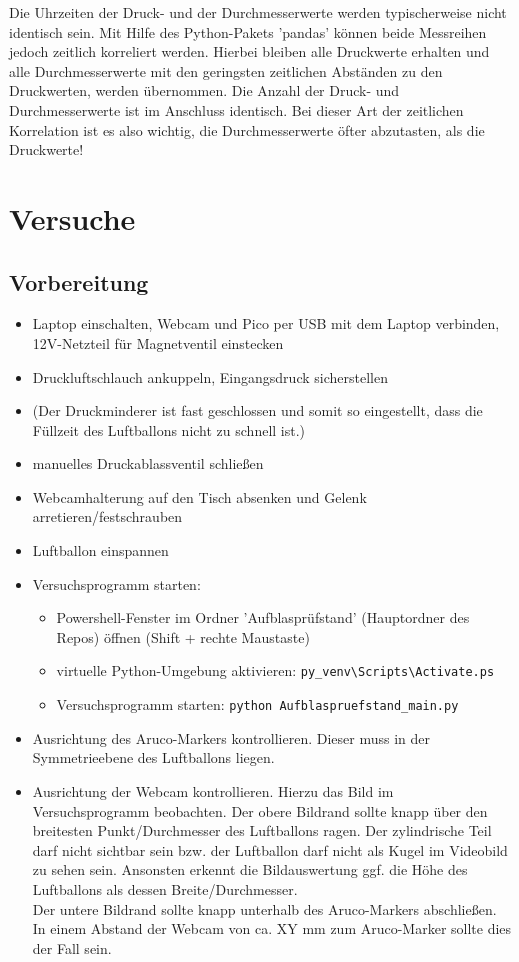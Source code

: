 \documentclass[german, 11pt]{scrartcl}
\begin{document}
Die Uhrzeiten der Druck- und der Durchmesserwerte werden typischerweise nicht identisch sein.
Mit Hilfe des Python-Pakets 'pandas' können beide Messreihen jedoch zeitlich korreliert werden.
Hierbei bleiben alle Druckwerte erhalten und alle Durchmesserwerte mit den geringsten zeitlichen Abständen
zu den Druckwerten, werden übernommen. Die Anzahl der Druck- und Durchmesserwerte ist im Anschluss identisch.
Bei dieser Art der zeitlichen Korrelation ist es also wichtig, die Durchmesserwerte öfter abzutasten, als die Druckwerte!

\section{Versuche}
\subsection{Vorbereitung}
\begin{itemize}
    \item Laptop einschalten, Webcam und Pico per USB mit dem Laptop verbinden, 12V-Netzteil für Magnetventil einstecken
    \item Druckluftschlauch ankuppeln, Eingangsdruck sicherstellen
    \item (Der Druckminderer ist fast geschlossen und somit so eingestellt, dass die Füllzeit des Luftballons nicht zu schnell ist.)
    \item manuelles Druckablassventil schließen
    \item Webcamhalterung auf den Tisch absenken und Gelenk arretieren/festschrauben
    \item Luftballon einspannen
    \item Versuchsprogramm starten:
    \begin{itemize}
        \item Powershell-Fenster im Ordner 'Aufblasprüfstand' (Hauptordner des Repos) öffnen (Shift + rechte Maustaste)
        \item virtuelle Python-Umgebung aktivieren: \texttt{py\_venv\textbackslash Scripts\textbackslash Activate.ps}
        \item Versuchsprogramm starten: \texttt{python Aufblaspruefstand\_main.py}
    \end{itemize}
    \item Ausrichtung des Aruco-Markers kontrollieren. Dieser muss in der Symmetrieebene des Luftballons liegen.
    \item Ausrichtung der Webcam kontrollieren. Hierzu das Bild im Versuchsprogramm beobachten.
    Der obere Bildrand sollte knapp über den breitesten Punkt/Durchmesser des Luftballons ragen.
    Der zylindrische Teil darf nicht sichtbar sein bzw. der Luftballon darf nicht als Kugel im Videobild zu sehen sein.
    Ansonsten erkennt die Bildauswertung ggf. die Höhe des Luftballons als dessen Breite/Durchmesser.\\
    Der untere Bildrand sollte knapp unterhalb des Aruco-Markers abschließen.
    In einem Abstand der Webcam von ca. XY mm zum Aruco-Marker sollte dies der Fall sein.
\end{itemize}
\end{document}
